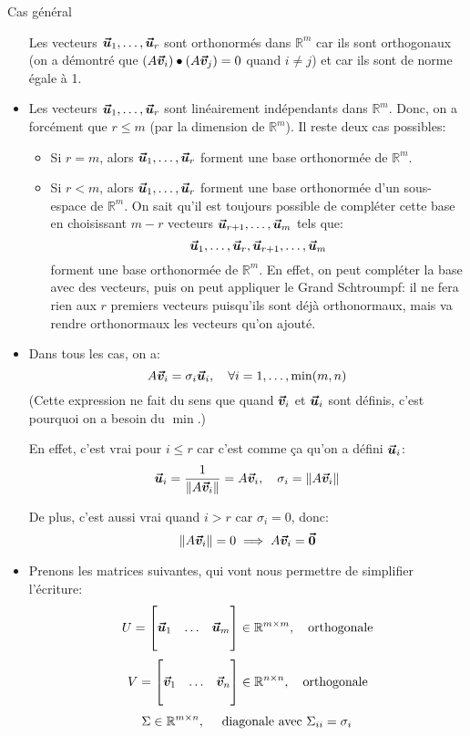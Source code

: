 \documentclass[a4paper]{article}
\begin{document}
\begin{parag}{Cas général}
\begin{itemize}[left=0pt]
    Les vecteurs $\bm{\protect\vec{u}}_1, \ldots, \bm{\protect\vec{u}}_r$ sont orthonormés dans $\mathbb{R}^m$ car ils sont orthogonaux (on a démontré que $\left(A \bvec{v}_i\right) \dotprod \left(A \bvec{v}_j\right) = 0$ quand $i \neq j$) et car ils sont de norme égale à 1.
    \item Les vecteurs $\bm{\protect\vec{u}}_1, \ldots, \bm{\protect\vec{u}}_r$ sont linéairement indépendants dans $\mathbb{R}^m$. Donc, on a forcément que $r \leq m$ (par la dimension de $\mathbb{R}^m$). Il reste deux cas possibles:
        \begin{itemize}
            \item Si $r = m$, alors $\bm{\protect\vec{u}}_1, \ldots, \bm{\protect\vec{u}}_r$ forment une base orthonormée de $\mathbb{R}^m$.
            \item Si $r < m$, alors $\bm{\protect\vec{u}}_1, \ldots, \bm{\protect\vec{u}}_r$ forment une base orthonormée d'un sous-espace de $\mathbb{R}^m$. On sait qu'il est toujours possible de compléter cette base en choisissant $m - r$ vecteurs $\bm{\protect\vec{u}}_{r+1}, \ldots, \bm{\protect\vec{u}}_m$ tels que:
            \[\bm{\protect\vec{u}}_1, \ldots, \bm{\protect\vec{u}}_r, \bm{\protect\vec{u}}_{r+1}, \ldots, \bm{\protect\vec{u}}_m\]
            forment une base orthonormée de $\mathbb{R}^m$. En effet, on peut compléter la base avec des vecteurs, puis on peut appliquer le Grand Schtroumpf: il ne fera rien aux $r$ premiers vecteurs puisqu'ils sont déjà orthonormaux, mais va rendre orthonormaux les vecteurs qu'on ajouté.
        \end{itemize}

    \item Dans tous les cas, on a:
    \[A \bvec{v}_i = \sigma_i \bvec{u}_i, \mathspace \forall i = 1, \ldots, \min\left(m, n\right)\]
    (Cette expression ne fait du sens que quand $\bm{\protect\vec{v}}_i$ et $\bm{\protect\vec{u}}_i$ sont définis, c'est pourquoi on a besoin du $\min$.)

    En effet, c'est vrai pour $i \leq r$ car c'est comme ça qu'on a défini $\bm{\protect\vec{u}}_i$:
    \[\bvec{u}_i = \frac{1}{\left\|A \bvec{v}_i\right\|} = A \bvec{v}_i, \mathspace \sigma_i = \left\| A \bvec{v}_i\right\|\]

    De plus, c'est aussi vrai quand $i > r$ car $\sigma_i = 0$, donc:
    \[\left\|A \bvec{v}_i\right\| = 0 \implies A \bvec{v}_i = \bvec{0}\]


    \item Prenons les matrices suivantes, qui vont nous permettre de simplifier l'écriture:
    \[U = \begin{bmatrix}  &  &  \\ \bm{\protect\vec{u}}_1 & \ldots & \bm{\protect\vec{u}}_m \\  &  &  \end{bmatrix} \in \mathbb{R}^{m \times m}, \quad \text{orthogonale}\]
    \[V = \begin{bmatrix}  &  &  \\ \bm{\protect\vec{v}}_1 & \ldots & \bm{\protect\vec{v}}_n \\  &  &  \end{bmatrix} \in \mathbb{R}^{n \times n}, \quad \text{orthogonale}\]
    \[\Sigma \in \mathbb{R}^{m \times n}, \quad \text{ diagonale avec } \Sigma_{ii} = \sigma_i\]


\end{itemize}
\end{parag}
\end{document}
